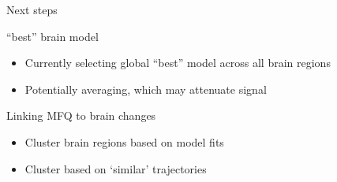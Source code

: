 \begin{frame}{Next steps}
  
  \begin{block}{``best'' brain model}
    \begin{itemize}
    \item Currently selecting global ``best'' model across all brain regions
    \item Potentially averaging, which may attenuate signal
    \end{itemize}
  \end{block}

  \begin{block}{Linking MFQ to brain changes}
    \begin{itemize}
    \item Cluster brain regions based on model fits
    \item Cluster based on `similar' trajectories
    \end{itemize}
  \end{block}

  
\end{frame}




